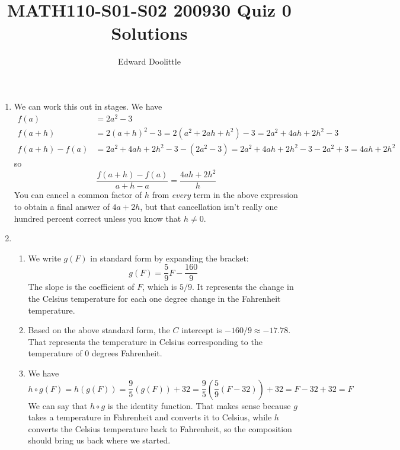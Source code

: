 \documentclass[12pt]{article}
\title{MATH110-S01-S02 200930 Quiz 0 Solutions}
\author{Edward Doolittle}
\begin{document}
\maketitle

\begin{enumerate}
\item We can work this out in stages.  We have
  \begin{align*}
    f(a) &= 2a^2-3 \\
    f(a+h) &= 2(a+h)^2-3 = 2(a^2+2ah+h^2) - 3 = 2a^2 + 4ah + 2h^2-3 \\
    f(a+h) - f(a) &= 2a^2+4ah + 2h^2- 3 - (2a^2-3) = 2a^2+4ah + 2h^2 - 3
    - 2a^2+3 = 4ah + 2h^2
  \end{align*}
  so 
  \begin{equation*}
    \frac{f(a+h)-f(a)}{a+h-a} 
    = \frac{4ah+2h^2}{h}
  \end{equation*}
  You can cancel a common factor of $h$ from \textit{every} term in the
  above expression to obtain a final answer of $4a+2h$, 
  but that cancellation isn't really one hundred percent 
  correct unless you know that $h\ne 0$.
\item 
  \begin{enumerate}
  \item We write $g(F)$ in standard form by expanding the bracket:
    \begin{equation*}
      g(F) = \frac{5}{9} F - \frac{160}{9}
    \end{equation*}
    The slope is the coefficient of $F$, which is $5/9$.  It represents
    the change in the Celsius temperature for each one degree change in
    the Fahrenheit temperature.
  \item Based on the above standard form, the $C$ intercept is $-160/9
    \approx -17.78$.  That represents the temperature in Celsius corresponding
    to the temperature of $0$ degrees Fahrenheit.
  \item We have
    \begin{equation*}
      h\circ g(F) = h(g(F)) = \frac{9}{5} (g(F)) + 32
      = \frac{9}{5} \left(\frac{5}{9} (F-32) \right) + 32
      = F-32 + 32 = F
    \end{equation*}
    We can say that $h\circ g$ is the identity function.  That makes sense
    because $g$ takes a temperature in Fahrenheit and converts it to 
    Celsius, while $h$ converts the Celsius temperature back to Fahrenheit,
    so the composition should bring us back where we started.
  \end{enumerate}
\end{enumerate}
\end{document}
